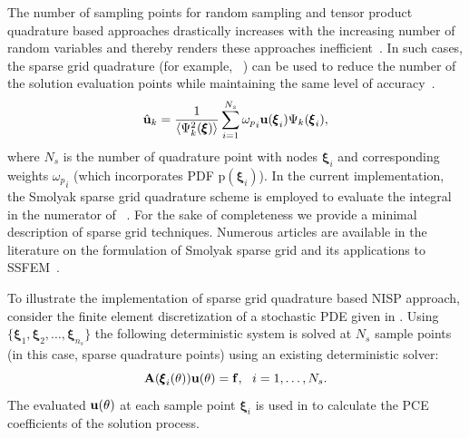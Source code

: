 \documentclass[letter,1p,11pt,oneside,onecolumn,sort&compress]{elsarticle}
\begin{document}
The number of sampling points for random sampling and tensor product quadrature based approaches drastically increases with the increasing number of random variables and thereby renders these approaches inefficient~\cite{ganapathysubramanian2007sparse,nobile2008sparse,eldred2009comparison}. In such cases, the sparse grid quadrature (for example, ~) can be used to reduce the number of the solution evaluation points while maintaining the same level of accuracy~\cite{le2010spectral,hosder2006non,ganapathysubramanian2007sparse,nobile2008sparse,eldred2009recent}.
\begin{align}\label{eq:sparseGridQuad}
  {\mathrm{\hat{\bf{u}}}_k} = \frac{1} {\left<{\Psi_k^2({\pmb{\xi}})}  \right>} \sum_{i=1}^{N_s} {{\omega}_p}_i {\mathrm{\bf{u}({\pmb{\xi}}}_i)} {\Psi_k({\pmb{\xi}}_i)},
\end{align}
where $N_s$ is the number of quadrature point with nodes ${\pmb{\xi}}_i$ and corresponding weights ${\omega_p}_i$ (which incorporates PDF ${\mathrm{p}}({\pmb{\xi}}_i)$).
In the current implementation, the Smolyak sparse grid quadrature scheme is employed to evaluate the integral in the numerator of ~\cite{ganapathysubramanian2007sparse,nobile2008sparse,eldred2009recent,constantine2012sparse}.
For the sake of completeness we provide a minimal description of sparse grid techniques.  Numerous articles are available in the literature on the formulation of Smolyak sparse grid and its applications to SSFEM~\cite{ganapathysubramanian2007sparse,nobile2008sparse,eldred2009recent,eldred2009comparison,constantine2012sparse,smith2013uncertainty}.

To illustrate the implementation of sparse grid quadrature based NISP approach, consider the finite element discretization of a stochastic PDE given in . Using $\{ \pmb{\xi}_{1}, \pmb{\xi}_{2}, \dots, \pmb{\xi}_{n_{s}} \}$ the following deterministic system is solved at $N_s$ sample points (in this case, sparse quadrature points) using an existing deterministic solver:
\begin{equation}\label{eq:nispSamp}
{\mathrm{\bf{A}}}({\pmb{\xi}}_{i}(\theta))  {\mathrm{\bf{u}}}(\theta) = {\mathrm{\bf{f}}}, \ \ i = 1,\dots,N_s.
\end{equation}
The evaluated $\bf{u}(\theta)$ at each sample point ${\pmb{\xi}}_i$ is used in  to calculate the PCE coefficients of the solution process.
\end{document}

